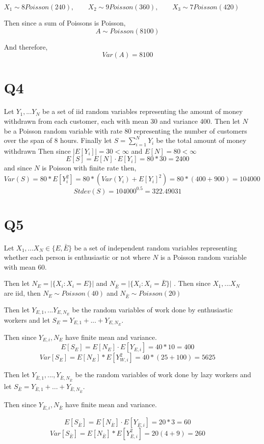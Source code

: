 \documentclass{article}
\begin{document}
$X_1 \sim 8 Poisson(240), \qquad X_2 \sim 9Poisson(360), \qquad X_3 \sim 7Poisson(420)$

Then since a sum of Poissons is Poisson,
$$
A \sim Poisson(8100)
$$

And therefore,
$$
Var(A) = 8100
$$


\section*{Q4}
Let $Y_1, ... Y_N$ be a set of iid random variables representing the amount of money withdrawn from each customer, each with mean 30 and variance 400. Then let $N$ be a Poisson random variable with rate 80 representing the number of customers over the span of 8 hours. 
Finally let $S = \sum_{i = 1} ^ N Y_i$ be the total amount of money withdrawn
Then since $|E[Y_i]| = 30 < \infty$ and $E[N] = 80 < \infty$ 
$$
E[S] = E[N] \cdot E[Y_i] = 80 * 30 = 2400
$$
and since $N$ is Poisson with finite rate then,
$$
Var(S) = 80 * E[Y_i^2] = 80 * ( Var(Y_i) + E[Y_i]^2) = 80*(400 + 900) = 104000
$$
$$
Stdev(S) = 104000^{0.5} = 322.49031
$$


\section*{Q5}

Let $X_1, ... X_N \in \{E, \bar E \}$ be a set of independent random variables representing whether each person is enthusiastic or not where $N$ is a Poisson random variable with mean 60.


Then let $N_E = \lvert \{ X_i : X_i = E \} \rvert$ and
$N_{\bar E} = \lvert \{ X_i : X_i = \bar E \}\rvert$ . Then since $X_1, ... X_N$ are iid, then $N_E \sim Poisson(40)$ and 
$N_{\bar E} \sim Poisson(20)$

Then let $Y_{E,1}, ... Y_{E,N_E}$ be the random variables of work done by enthusiastic workers and let $S_E = Y_{E,1}+ ...+ Y_{E,N_E}$.

Then since $Y_{E,i}, N_E$ have finite mean and variance. 
$$
E[S_E] = E[N_E] \cdot E[Y_{E,i}] = 40 * 10 = 400
$$
$$
Var[S_E] = E[N_E] * E[Y_{W,i}^2] = 40 * (25 + 100) = 5625
$$

Then let $Y_{\bar E,1}, ..., Y_{\bar{E},N_{\bar E}}$ be the random variables of work done by lazy workers and let 
$S_{\bar E} = Y_{\bar E,1}+ ...+ Y_{\bar E,N_{\bar E}}$.

Then since $Y_{\bar E, i}, N_{\bar E}$ have finite mean and variance.

$$
E[S_{\bar E}] = E[N_{\bar E}] \cdot E[Y_{\bar E, i}] = 20 * 3 = 60
$$
$$
Var[S_{\bar E}] = E[N_{\bar E}] * E[Y_{\bar E, i}^2] = 20 (4 + 9) = 260
$$
\end{document}
